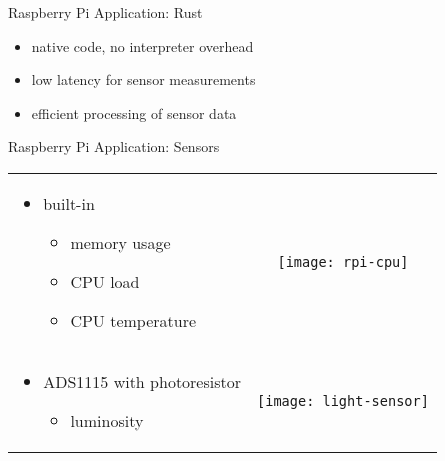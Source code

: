 \documentclass[aspectratio=1610]{beamer}
\begin{document}
  \begin{frame}{Raspberry Pi Application: Rust}
    \begin{itemize}
      \item native code, no interpreter overhead
      \item low latency for sensor measurements
      \item efficient processing of sensor data
    \end{itemize}
  \end{frame}

  \begin{frame}{Raspberry Pi Application: Sensors}
    \begin{tabularx}{\textwidth}{XC}
      \begin{itemize}
        \item built-in
          \begin{itemize}
            \item memory usage
            \item CPU load
            \item CPU temperature
          \end{itemize}
      \end{itemize}
      &
      \texttt{[image: rpi-cpu]}
      \\
      \begin{itemize}
        \item ADS1115 with photoresistor
          \begin{itemize}
            \item luminosity
          \end{itemize}
      \end{itemize}
      &
      \texttt{[image: light-sensor]}
    \end{tabularx}
  \end{frame}
\end{document}
